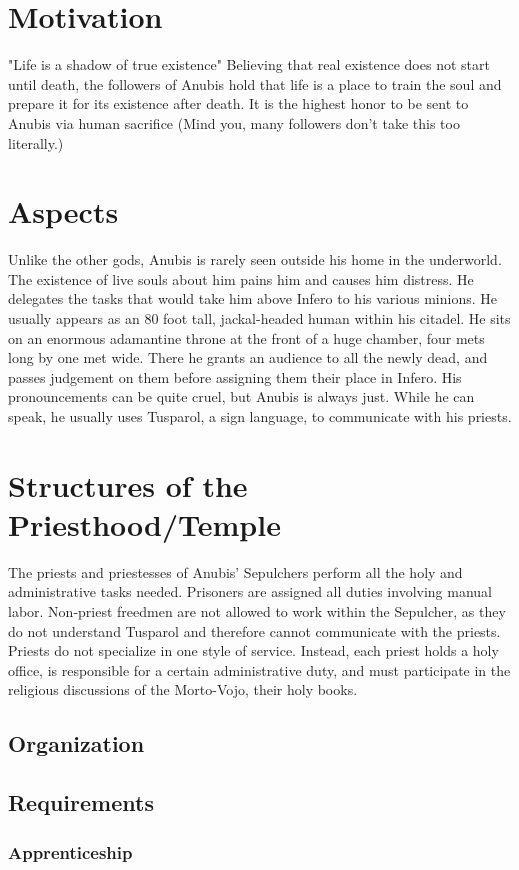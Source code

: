 \section{Motivation}
"Life is a shadow of true existence"
Believing that real existence does not start until death, the followers of Anubis hold that life is a place to train the soul and prepare it for its existence after death. It is the highest honor to be sent to Anubis via human sacrifice (Mind you, many followers don’t take this too literally.)
\section{Aspects}
Unlike the other gods, Anubis is rarely seen outside his home in the underworld. The existence of live souls about him pains him and causes him distress. He delegates the tasks that would take him above Infero to his various minions.
He usually appears as an 80 foot tall, jackal-headed human within his citadel. He sits on an enormous adamantine throne at the front of a huge chamber, four mets long by one met wide. There he grants an audience to all the newly dead, and passes judgement on them before assigning them their place in Infero. His pronouncements can be quite cruel, but Anubis is always just. While he can speak, he usually uses Tusparol, a sign language, to communicate with his priests.
\section{Structures of the Priesthood/Temple}
The priests and priestesses of Anubis’ Sepulchers perform all the holy and administrative tasks needed. Prisoners are assigned all duties involving manual labor. Non-priest freedmen are not allowed to work within the Sepulcher, as they do not understand Tusparol and therefore cannot communicate with the priests.
Priests do not specialize in one style of service. Instead, each priest holds a holy office, is responsible for a certain administrative duty, and must participate in the religious discussions of the Morto-Vojo, their holy books.
\subsection{Organization}
\subsection{Requirements}
\subsubsection{Apprenticeship}
